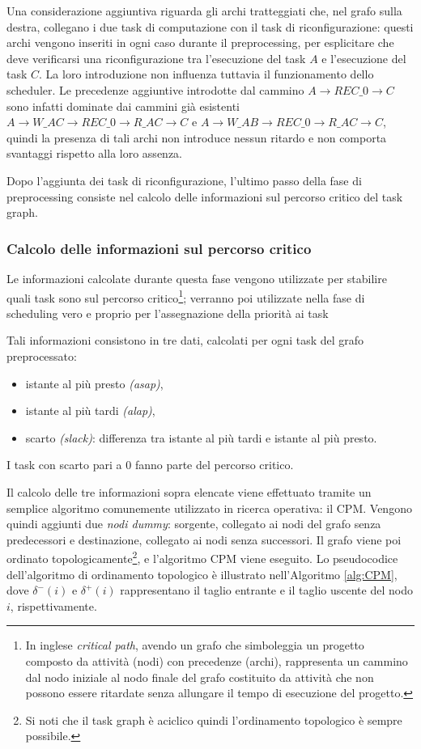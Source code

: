Una considerazione 
aggiuntiva riguarda gli archi tratteggiati che, nel grafo sulla destra, 
collegano i due task di computazione con il task di riconfigurazione: questi 
archi vengono inseriti in ogni caso durante il preprocessing, per esplicitare 
che deve verificarsi una riconfigurazione tra l'esecuzione del task $A$ e 
l'esecuzione del task $C$. La loro introduzione non influenza tuttavia il 
funzionamento dello scheduler. Le precedenze aggiuntive introdotte dal cammino 
$A \rightarrow REC\_0 \rightarrow C$ sono infatti dominate dai cammini già 
esistenti $A \rightarrow W\_AC \rightarrow REC\_0 \rightarrow R\_AC \rightarrow 
C$ e $A \rightarrow W\_AB \rightarrow REC\_0 \rightarrow R\_AC \rightarrow C$, 
quindi la presenza di tali archi non introduce nessun ritardo e non comporta 
svantaggi rispetto alla loro assenza.

Dopo l'aggiunta dei task di riconfigurazione, l'ultimo passo della fase di 
preprocessing consiste nel calcolo delle informazioni sul percorso critico del 
task graph.


\subsubsection{Calcolo delle informazioni sul percorso critico}
Le informazioni calcolate durante questa fase vengono utilizzate per stabilire 
quali task sono sul percorso critico\footnote{In inglese \emph{critical path}, 
avendo un grafo che simboleggia un progetto composto da attività (nodi) con 
precedenze (archi), rappresenta un cammino dal nodo iniziale al nodo finale del 
grafo costituito da attività che non possono essere ritardate senza allungare 
il tempo di esecuzione del progetto.}; verranno poi utilizzate nella fase di 
scheduling vero e proprio per l'assegnazione della priorità ai task

Tali informazioni consistono in tre dati, calcolati per ogni task del grafo 
preprocessato:
\begin{itemize}
 \item istante al più presto \emph{(asap)},
 \item istante al più tardi \emph{(alap)},
 \item scarto \emph{(slack)}: differenza tra istante al più tardi e istante al 
più presto.
\end{itemize}
I task con scarto pari a $0$ fanno parte del percorso critico.

Il calcolo delle tre informazioni sopra elencate viene effettuato tramite un 
semplice algoritmo comunemente utilizzato in ricerca operativa: il \ac{CPM}.
Vengono quindi aggiunti due \emph{nodi dummy}: sorgente, collegato ai nodi del 
grafo senza predecessori e destinazione, collegato ai nodi senza successori.
Il grafo viene poi ordinato topologicamente\footnote{Si noti che il task graph 
è aciclico quindi l'ordinamento topologico è sempre possibile.}, e l'algoritmo 
\ac{CPM} viene eseguito. Lo pseudocodice dell'algoritmo di ordinamento 
topologico è illustrato nell'Algoritmo \ref{alg:CPM}, dove $\delta^-(i)$ e 
$\delta^+(i)$ rappresentano il taglio entrante e il taglio uscente del nodo 
$i$, rispettivamente.


